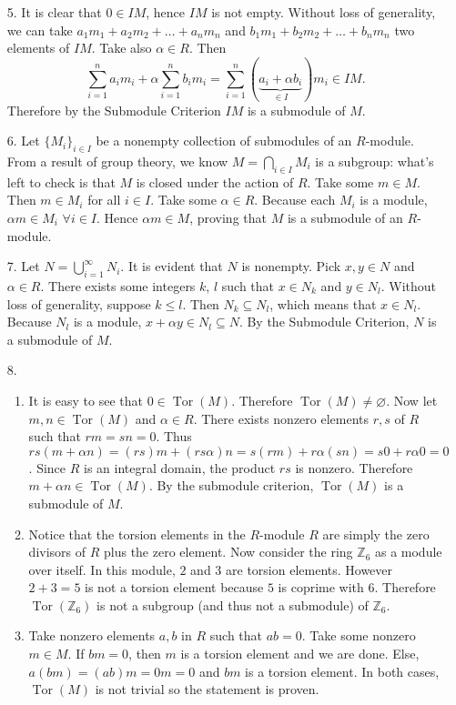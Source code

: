 \documentclass{report}
\DeclareMathOperator{\Tor}{Tor}
\begin{document}
\begin{enumerate}
\item[5.]
It is clear that $0\in IM$, hence $IM$ is not empty. Without loss of generality, we can take $a_1m_1+a_2m_2+\dots+a_nm_n$ and $b_1m_1+b_2m_2+\dots+b_nm_n$ two elements of $IM$. Take also $\alpha\in R$. Then
\begin{equation*}
\sum_{i=1}^na_im_i+\alpha\sum_{i=1}^nb_im_i = \sum_{i=1}^n(\underbrace{a_i+\alpha b_i}_{\in I})m_i \in IM.
\end{equation*}
Therefore by the Submodule Criterion $IM$ is a submodule of $M$.

\item[6.]
Let $\{M_i\}_{i\in I}$ be a nonempty collection of submodules of an $R$-module. From a result of group theory, we know $M=\bigcap_{i\in I}M_i$ is a subgroup: what's left to check is that $M$ is closed under the action of $R$. Take some $m\in M$. Then $m\in M_i$ for all $i\in I$. Take some $\alpha\in R$. Because each $M_i$ is a module, $\alpha m\in M_i$ $\forall i\in I$. Hence $\alpha m\in M$, proving that $M$ is a submodule of an $R$-module.

\item[7.]
Let $N=\bigcup_{i=1}^\infty N_i$. It is evident that $N$ is nonempty. Pick $x,y\in N$ and $\alpha\in R$. There exists some integers $k$, $l$ such that $x\in N_k$ and $y\in N_l$. Without loss of generality, suppose $k\leq l$. Then $N_k\subseteq N_l$, which means that $x\in N_l$. Because $N_l$ is a module, $x+\alpha y\in N_l\subseteq N$. By the Submodule Criterion, $N$ is a submodule of $M$.

\item[8.]
\begin{enumerate}
\item
It is easy to see that $0 \in \Tor(M)$. Therefore $\Tor(M) \neq \varnothing$. Now let $m,n \in \Tor(M)$ and $\alpha \in R$. There exists nonzero elements $r,s$ of $R$ such that $rm=sn=0$. Thus $rs(m+\alpha n) = (rs)m+(rs\alpha)n = s(rm)+r\alpha(sn) = s0+r\alpha0 = 0$. Since $R$ is an integral domain, the product $rs$ is nonzero. Therefore $m+\alpha n \in \Tor(M)$. By the submodule criterion, $\Tor(M)$ is a submodule of $M$.
\item
Notice that the torsion elements in the $R$-module $R$ are simply the zero divisors of $R$ plus the zero element. Now consider the ring $\mathbb{Z}_6$ as a module over itself. In this module, $2$ and $3$ are torsion elements. However $2+3=5$ is not a torsion element because $5$ is coprime with $6$. Therefore $\Tor(\mathbb{Z}_6)$ is not a subgroup (and thus not a submodule) of $\mathbb{Z}_6$.
\item
Take nonzero elements $a,b$ in $R$ such that $ab=0$. Take some nonzero $m\in M$. If $bm=0$, then $m$ is a torsion element and we are done. Else, $a(bm) = (ab)m = 0m=0$ and $bm$ is a torsion element. In both cases, $\Tor(M)$ is not trivial so the statement is proven.
\end{enumerate}


\end{enumerate}
\end{document}
